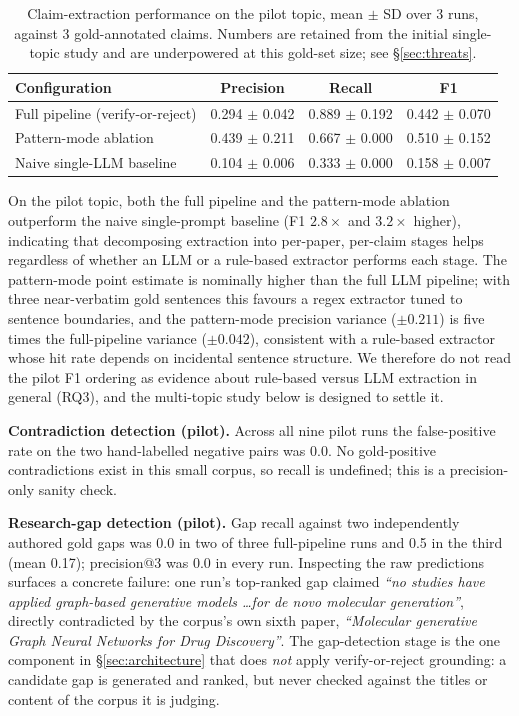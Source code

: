 \documentclass[11pt]{article}
\begin{document}
\begin{table}[h]
\centering
\caption{Claim-extraction performance on the pilot topic, mean $\pm$ SD over 3 runs, against 3 gold-annotated claims. Numbers are retained from the initial single-topic study and are underpowered at this gold-set size; see \S\ref{sec:threats}.}
\label{tab:claims}
\begin{tabular}{@{}lccc@{}}
\toprule
Configuration & Precision & Recall & F1 \\
\midrule
Full pipeline (verify-or-reject) & 0.294 $\pm$ 0.042 & 0.889 $\pm$ 0.192 & 0.442 $\pm$ 0.070 \\
Pattern-mode ablation & 0.439 $\pm$ 0.211 & 0.667 $\pm$ 0.000 & 0.510 $\pm$ 0.152 \\
Naive single-LLM baseline & 0.104 $\pm$ 0.006 & 0.333 $\pm$ 0.000 & 0.158 $\pm$ 0.007 \\
\bottomrule
\end{tabular}
\end{table}

On the pilot topic, both the full pipeline and the pattern-mode ablation
outperform the naive single-prompt baseline (F1 $2.8\times$ and $3.2\times$
higher), indicating that decomposing extraction into per-paper, per-claim stages
helps regardless of whether an LLM or a rule-based extractor performs each
stage. The pattern-mode point estimate is nominally higher than the full LLM
pipeline; with three near-verbatim gold sentences this favours a regex extractor
tuned to sentence boundaries, and the pattern-mode precision variance
($\pm 0.211$) is five times the full-pipeline variance ($\pm 0.042$),
consistent with a rule-based extractor whose hit rate depends on incidental
sentence structure. We therefore do not read the pilot F1 ordering as evidence
about rule-based versus LLM extraction in general (RQ3), and the multi-topic
study below is designed to settle it.

\textbf{Contradiction detection (pilot).} Across all nine pilot runs the
false-positive rate on the two hand-labelled negative pairs was 0.0. No
gold-positive contradictions exist in this small corpus, so recall is undefined;
this is a precision-only sanity check.

\textbf{Research-gap detection (pilot).} Gap recall against two independently
authored gold gaps was 0.0 in two of three full-pipeline runs and 0.5 in the
third (mean 0.17); precision@3 was 0.0 in every run. Inspecting the raw
predictions surfaces a concrete failure: one run's top-ranked gap claimed
\emph{``no studies have applied graph-based generative models \ldots for de novo
molecular generation''}, directly contradicted by the corpus's own sixth paper,
\emph{``Molecular generative Graph Neural Networks for Drug Discovery''}. The
gap-detection stage is the one component in \S\ref{sec:architecture} that does
\emph{not} apply verify-or-reject grounding: a candidate gap is generated and
ranked, but never checked against the titles or content of the corpus it is
judging.
\end{document}

